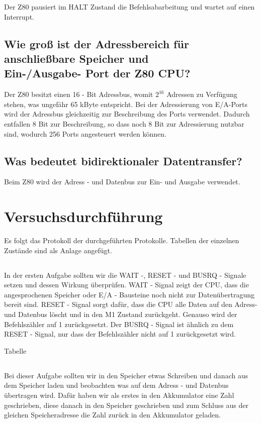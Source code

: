 \documentclass[a4paper,11pt]{article}
\begin{document}
Der Z80 pausiert im HALT Zustand die Befehlsabarbeitung und wartet auf einen Interrupt.

\subsection{Wie groß ist der Adressbereich für anschließbare Speicher und \\
Ein-/Ausgabe- Port der Z80 CPU?}

Der Z80 besitzt einen 16 - Bit Adressbus, womit $2^{16}$ Adressen zu Verfügung stehen, was ungefähr 65 kByte entspricht. Bei der Adressierung von E/A-Ports wird der Adressbus gleichzeitig zur Beschreibung des Ports verwendet. Dadurch entfallen 8 Bit zur Beschreibung, so dass noch 8 Bit zur Adressierung nutzbar sind, wodurch 256 Ports angesteuert werden können.

\subsection{Was bedeutet bidirektionaler Datentransfer?}

Beim Z80 wird der Adress - und Datenbus zur Ein- und Ausgabe verwendet.

\section{Versuchsdurchführung}

Es folgt das Protokoll der durchgeführten Protokolle. Tabellen der einzelnen Zustände sind als Anlage angefügt.

\subsection{}
In der ersten Aufgabe sollten wir die WAIT -, RESET - und BUSRQ - Signale setzen und dessen Wirkung überprüfen. 
WAIT - Signal zeigt der CPU, dass die angesprochenen Speicher oder E/A - Bausteine noch nicht zur Datenübertragung bereit sind.
RESET - Signal sorgt dafür, dass die CPU alle Daten auf den Adress- und Datenbus löscht und in den M1 Zustand zurückgeht. Genauso wird der Befehlszähler auf 1 zurückgesetzt.
Der BUSRQ - Signal ist ähnlich zu dem RESET - Signal, nur dass der Befehlszähler nicht auf 1 zurückgesetzt wird.

Tabelle

\subsection{}
Bei dieser Aufgabe sollten wir in den Speicher etwas Schreiben und danach aus dem Speicher laden und beobachten was auf dem Adress -  und Datenbus übertragen wird. 
Dafür haben wir als erstes in den Akkumulator eine Zahl geschrieben, diese danach in den Speicher geschrieben und zum Schluss aus der gleichen Speicheradresse die Zahl zurück in den Akkumulator geladen.
\end{document}
